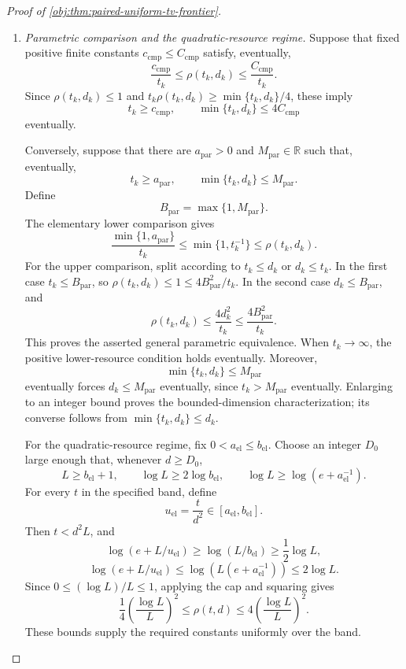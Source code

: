 \documentclass[11pt]{article}
\begin{document}
\begin{proof}[Proof of \cref{obj:thm:paired-uniform-tv-frontier}]
\begin{enumerate}
\item \textit{Parametric comparison and the quadratic-resource regime.}
Suppose that fixed positive finite constants
\(c_{\mathrm{cmp}}\le C_{\mathrm{cmp}}\) satisfy, eventually,
\[
\frac{c_{\mathrm{cmp}}}{t_k}
\le\rho(t_k,d_k)
\le\frac{C_{\mathrm{cmp}}}{t_k}.
\]
Since \(\rho(t_k,d_k)\le1\) and
\(t_k\rho(t_k,d_k)\ge\min\{t_k,d_k\}/4\), these imply
\[
t_k\ge c_{\mathrm{cmp}},
\qquad
\min\{t_k,d_k\}\le4C_{\mathrm{cmp}}
\]
eventually.

Conversely, suppose that there are \(a_{\mathrm{par}}>0\) and
\(M_{\mathrm{par}}\in\mathbb R\) such that, eventually,
\[
t_k\ge a_{\mathrm{par}},
\qquad
\min\{t_k,d_k\}\le M_{\mathrm{par}}.
\]
Define
\[
B_{\mathrm{par}}=\max\{1,M_{\mathrm{par}}\}.
\]
The elementary lower comparison gives
\[
\frac{\min\{1,a_{\mathrm{par}}\}}{t_k}
\le\min\{1,t_k^{-1}\}\le\rho(t_k,d_k).
\]
For the upper comparison, split according to \(t_k\le d_k\) or \(d_k\le t_k\).
In the first case \(t_k\le B_{\mathrm{par}}\), so
\(\rho(t_k,d_k)\le1\le4B_{\mathrm{par}}^2/t_k\).
In the second case \(d_k\le B_{\mathrm{par}}\), and
\[
\rho(t_k,d_k)\le\frac{4d_k^2}{t_k}
\le\frac{4B_{\mathrm{par}}^2}{t_k}.
\]
This proves the asserted general parametric equivalence.
When \(t_k\to\infty\), the positive lower-resource condition holds eventually. Moreover,
\[
\min\{t_k,d_k\}\le M_{\mathrm{par}}
\]
eventually forces \(d_k\le M_{\mathrm{par}}\) eventually, since
\(t_k>M_{\mathrm{par}}\) eventually. Enlarging to an integer bound proves the bounded-dimension characterization; its converse follows from
\(\min\{t_k,d_k\}\le d_k\).

For the quadratic-resource regime, fix
\(0<a_{\mathrm{el}}\le b_{\mathrm{el}}\).
Choose an integer \(D_0\) large enough that, whenever \(d\ge D_0\),
\[
L\ge b_{\mathrm{el}}+1,\qquad
\log L\ge2\log b_{\mathrm{el}},\qquad
\log L\ge\log(e+a_{\mathrm{el}}^{-1}).
\]
For every \(t\) in the specified band, define
\[
u_{\mathrm{el}}=\frac{t}{d^2}\in[a_{\mathrm{el}},b_{\mathrm{el}}].
\]
Then \(t<d^2L\), and
\[
\log(e+L/u_{\mathrm{el}})
\ge\log(L/b_{\mathrm{el}})
\ge\frac12\log L,
\]
\[
\log(e+L/u_{\mathrm{el}})
\le\log\!\left(L(e+a_{\mathrm{el}}^{-1})\right)
\le2\log L.
\]
Since \(0\le(\log L)/L\le1\), applying the cap and squaring gives
\[
\frac14\left(\frac{\log L}{L}\right)^2
\le\rho(t,d)
\le4\left(\frac{\log L}{L}\right)^2.
\]
These bounds supply the required constants uniformly over the band.


\end{enumerate}
\end{proof}
\end{document}
